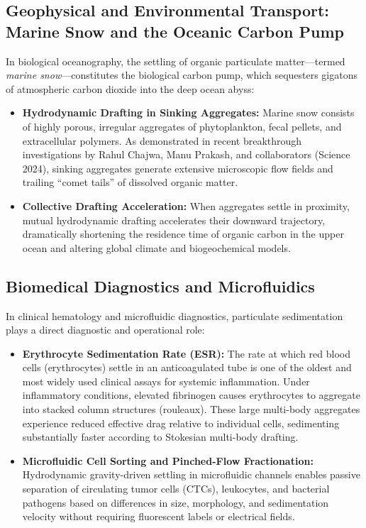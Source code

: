 \documentclass[11pt,a4paper]{article}
\begin{document}
\subsection{Geophysical and Environmental Transport: Marine Snow and the Oceanic Carbon Pump}
In biological oceanography, the settling of organic particulate matter---termed \emph{marine snow}---constitutes the biological carbon pump, which sequesters gigatons of atmospheric carbon dioxide into the deep ocean abyss:
\begin{itemize}
    \item \textbf{Hydrodynamic Drafting in Sinking Aggregates:} Marine snow consists of highly porous, irregular aggregates of phytoplankton, fecal pellets, and extracellular polymers. As demonstrated in recent breakthrough investigations by Rahul Chajwa, Manu Prakash, and collaborators (Science 2024), sinking aggregates generate extensive microscopic flow fields and trailing ``comet tails'' of dissolved organic matter.
    \item \textbf{Collective Drafting Acceleration:} When aggregates settle in proximity, mutual hydrodynamic drafting accelerates their downward trajectory, dramatically shortening the residence time of organic carbon in the upper ocean and altering global climate and biogeochemical models.
\end{itemize}

\subsection{Biomedical Diagnostics and Microfluidics}
In clinical hematology and microfluidic diagnostics, particulate sedimentation plays a direct diagnostic and operational role:
\begin{itemize}
    \item \textbf{Erythrocyte Sedimentation Rate (ESR):} The rate at which red blood cells (erythrocytes) settle in an anticoagulated tube is one of the oldest and most widely used clinical assays for systemic inflammation. Under inflammatory conditions, elevated fibrinogen causes erythrocytes to aggregate into stacked column structures (rouleaux). These large multi-body aggregates experience reduced effective drag relative to individual cells, sedimenting substantially faster according to Stokesian multi-body drafting.
    \item \textbf{Microfluidic Cell Sorting and Pinched-Flow Fractionation:} Hydrodynamic gravity-driven settling in microfluidic channels enables passive separation of circulating tumor cells (CTCs), leukocytes, and bacterial pathogens based on differences in size, morphology, and sedimentation velocity without requiring fluorescent labels or electrical fields.
\end{itemize}
\end{document}
